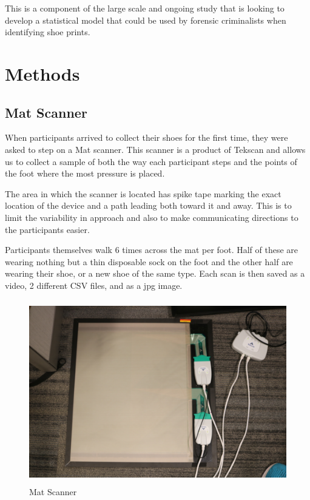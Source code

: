   This is a component of the large scale and ongoing study that is looking to develop a statistical model that could be used by forensic criminalists when identifying shoe prints. 
 

\section{Methods}
\label{sec:examples}
\subsection{Mat Scanner}

   When participants arrived to collect their shoes for the first time, they were asked to step on a Mat scanner. This scanner is a product of Tekscan and allows us to collect a sample of both the way each participant steps and the points of the foot where the most pressure is placed. 
   
   The area in which the scanner is located has spike tape marking the exact location of the device and a path leading both toward it and away. This is to limit the variability in approach and also to make communicating directions to the participants easier. 
   
   Participants themselves walk 6 times across the mat per foot. Half of these are wearing nothing but a thin disposable sock on the foot and the other half are wearing their shoe, or a new shoe of the same type. Each scan is then saved as a video, 2 different CSV files, and as a jpg image. 

\begin{figure}[!htp]
\centering
\includegraphics[width=12cm, height=8cm]{Mat_Scanner}
\caption{Mat Scanner}
\label{Image 1}
\end{figure}

